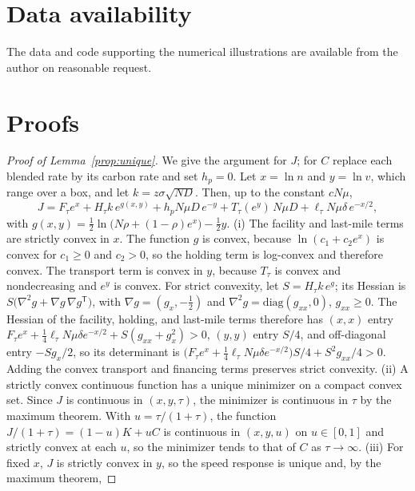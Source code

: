 \documentclass[11pt]{article}
\numberwithin{proposition}{section}
\theoremstyle{definition}
\theoremstyle{remark}
\theoremstyle{plain}
\begin{document}
\section*{Data availability}

\noindent The data and code supporting the numerical illustrations are available from the author on reasonable
request.




\appendix
\section{Proofs}\label{app:proofs}

\begin{proof}[Proof of Lemma~\ref{prop:unique}]
We give the argument for $J$; for $C$ replace each blended rate by its carbon rate and set $h_p=0$. Let $x=\ln n$ and $y=\ln v$,
which range over a box, and let $k=z\sigma\sqrt{ND}$. Then, up to the constant $cN\mu$,
\[
  J=F_\tau e^{x}+H_\tau k\,e^{g(x,y)}+h_pN\mu D\,e^{-y}+T_\tau(e^{y})\,N\mu D+\ell_\tau N\mu\delta\,e^{-x/2},
\]
with $g(x,y)=\tfrac12\ln\big(N\rho+(1-\rho)e^{x}\big)-\tfrac12y$.
(i) The facility and last-mile terms are strictly convex in $x$. The function $g$ is convex, because
$\ln(c_1+c_2e^{x})$ is convex for $c_1\ge0$ and $c_2>0$, so the holding term is log-convex and therefore convex. The
transport term is convex in $y$, because $T_\tau$ is convex and nondecreasing and $e^{y}$ is convex. For strict
convexity, let $S=H_\tau k\,e^{g}$; its Hessian is $S\big(\nabla^2g+\nabla g\,\nabla g^{\mathsf T}\big)$, with
$\nabla g=(g_x,-\tfrac12)$ and $\nabla^2g=\mathrm{diag}(g_{xx},0)$, $g_{xx}\ge0$. The Hessian of the facility,
holding, and last-mile terms therefore has $(x,x)$ entry
$F_\tau e^{x}+\tfrac14\ell_\tau N\mu\delta e^{-x/2}+S(g_{xx}+g_x^2)>0$, $(y,y)$ entry $S/4$, and off-diagonal
entry $-Sg_x/2$, so its determinant is $\big(F_\tau e^{x}+\tfrac14\ell_\tau N\mu\delta e^{-x/2}\big)S/4+S^2g_{xx}/4>0$.
Adding the convex transport and financing terms preserves strict convexity.
(ii) A strictly convex continuous function has a unique minimizer on a compact convex set. Since $J$ is continuous
in $(x,y,\tau)$, the minimizer is continuous in $\tau$ by the maximum theorem. With $u=\tau/(1+\tau)$, the function $J/(1+\tau)=(1-u)K+uC$ is continuous in $(x,y,u)$ on $u\in[0,1]$ and strictly convex at each $u$, so the minimizer tends to that of $C$ as $\tau\to\infty$.
(iii) For fixed $x$, $J$ is strictly convex in $y$, so the speed response is unique and, by the maximum theorem,

\end{proof}
\end{document}
